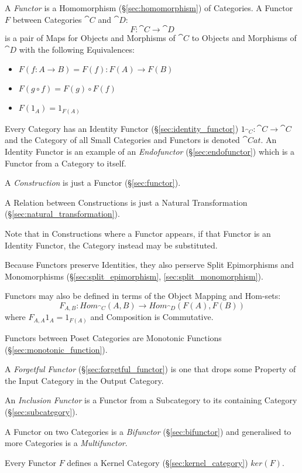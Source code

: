 A \emph{Functor} is a Homomorphism (\S\ref{sec:homomorphism}) of
Categories. A Functor $F$ between Categories $\cat{C}$ and $\cat{D}$:
\[
  F : \cat{C} \rightarrow \cat{D}
\]
is a pair of Maps for Objects and Morphisms of $\cat{C}$ to Objects
and Morphisms of $\cat{D}$ with the following Equivalences:
\begin{itemize}
\item $F(f : A \rightarrow B) = F(f) : F(A) \rightarrow F(B)$
\item $F(g \circ f) = F(g) \circ F(f)$
\item $F(1_A) = 1_{F(A)}$
\end{itemize}
Every Category has an Identity Functor (\S\ref{sec:identity_functor})
$1_{\cat{C}} : \cat{C} \rightarrow \cat{C}$ and the Category
of all Small Categories and Functors is denoted $\cat{Cat}$. An
Identity Functor is an example of an \emph{Endofunctor}
(\S\ref{sec:endofunctor}) which is a Functor from a Category to
itself.

A \emph{Construction} is just a Functor (\S\ref{sec:functor}).

A Relation between Constructions is just a Natural Transformation
(\S\ref{sec:natural_transformation}).

\fist Note that in Constructions where a Functor appears, if
that Functor is an Identity Functor, the Category instead may be
substituted.

Because Functors preserve Identities, they also perserve Split
Epimorphisms and Monomorphisms (\S\ref{sec:split_epimorphism},
\ref{sec:split_monomorphism}).

Functors may also be defined in terms of the Object Mapping and
Hom-sets:
\[
  F_{A,B} : Hom_{\cat{C}}(A,B) \rightarrow Hom_{\cat{D}}(F(A),F(B))
\]
where $F_{A,A}1_A = 1_{F(A)}$ and Composition is Commutative.

Functors between Poset Categories are Monotonic Functions
(\S\ref{sec:monotonic_function}).

A \emph{Forgetful Functor} (\S\ref{sec:forgetful_functor}) is one that
drops some Property of the Input Category in the Output Category.

An \emph{Inclusion Functor} is a Functor from a Subcategory to its
containing Category (\S\ref{sec:subcategory}).

A Functor on two Categories is a \emph{Bifunctor}
(\S\ref{sec:bifunctor}) and generalised to more Categories is a
\emph{Multifunctor}.

Every Functor $F$ defines a Kernel Category
(\S\ref{sec:kernel_category}) $ker(F)$.



